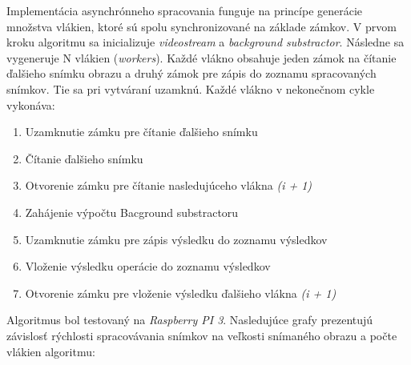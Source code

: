 Implementácia asynchrónneho spracovania funguje na princípe generácie množstva vlákien, ktoré sú spolu synchronizované na základe zámkov. V prvom kroku algoritmu sa inicializuje \textit{videostream} a \textit{background substractor}. Následne sa vygeneruje N vlákien (\textit{workers}). Každé vlákno obsahuje jeden zámok na čítanie ďalšieho snímku obrazu a druhý zámok pre zápis do zoznamu spracovaných snímkov. Tie sa pri vytváraní uzamknú. Každé vlákno v nekonečnom cykle vykonáva:
\begin{enumerate}
\item Uzamknutie zámku pre čítanie ďalšieho snímku
\item Čítanie ďalšieho snímku 
\item Otvorenie zámku pre čítanie nasledujúceho vlákna \textit{(i + 1)}
\item Zahájenie výpočtu Bacground substractoru
\item Uzamknutie zámku pre zápis výsledku do zoznamu výsledkov
\item Vloženie výsledku operácie do zoznamu výsledkov 
\item Otvorenie zámku pre vloženie výsledku ďalšieho vlákna \textit{(i + 1)} 
\end{enumerate}

Algoritmus bol testovaný na \textit{Raspberry PI 3}. Nasledujúce grafy prezentujú závislosť rýchlosti spracovávania snímkov na veľkosti snímaného obrazu a počte vlákien algoritmu:

